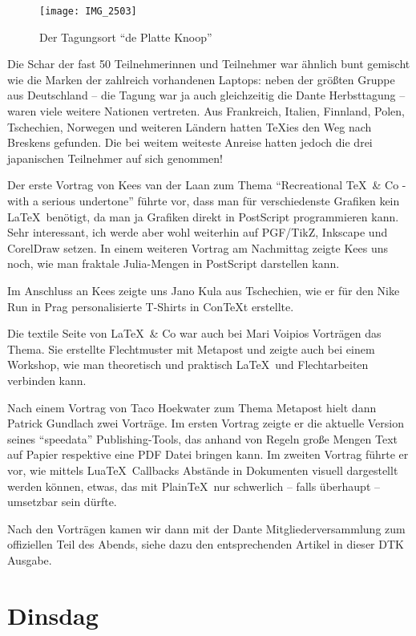 \documentclass[12pt,ngerman]{dtk}
\begin{document}
\begin{figure}
\centering
\texttt{[image: IMG\_2503]}
\caption{Der Tagungsort \enquote{de Platte Knoop}}
\end{figure}

Die Schar der fast 50 Teilnehmerinnen und Teilnehmer war ähnlich bunt gemischt wie die Marken der
 zahlreich vorhandenen Laptops: neben der größten Gruppe aus Deutschland -- die Tagung war ja auch
 gleichzeitig die Dante Herbsttagung -- waren viele weitere Nationen vertreten. Aus Frankreich, Italien,
 Finnland, Polen, Tschechien, Norwegen und weiteren Ländern hatten \TeX ies den Weg nach Breskens
 gefunden. Die bei weitem weiteste Anreise hatten jedoch die drei japanischen Teilnehmer auf sich
 genommen!

Der erste Vortrag von Kees van der Laan zum Thema \enquote{Recreational \TeX\ \& Co - with a serious
 undertone} führte vor, dass man für verschiedenste Grafiken kein \LaTeX\ benötigt, da man ja Grafiken
 direkt in PostScript programmieren kann. Sehr interessant, ich werde aber wohl weiterhin auf PGF/TikZ,
 Inkscape und CorelDraw setzen. In einem weiteren Vortrag am Nachmittag zeigte Kees uns noch, wie
 man fraktale Julia-Mengen in PostScript darstellen kann.

Im Anschluss an Kees zeigte uns Jano Kula aus Tschechien, wie er für den Nike Run in Prag
 personalisierte T-Shirts in Con\TeX t erstellte.

Die textile Seite von \LaTeX\ \& Co war auch bei Mari Voipios Vorträgen das Thema. Sie erstellte
 Flechtmuster mit Metapost  und zeigte auch bei einem Workshop, wie man theoretisch und praktisch
 \LaTeX\ und Flechtarbeiten verbinden kann.

Nach einem Vortrag von Taco Hoekwater zum Thema Metapost hielt dann Patrick Gundlach zwei
 Vorträge. Im ersten Vortrag zeigte er die aktuelle Version seines \enquote{speedata} Publishing-Tools,
 das anhand von Regeln große Mengen Text auf Papier respektive eine PDF Datei bringen kann. 
Im zweiten Vortrag führte er vor, wie mittels Lua\TeX\ Callbacks Abstände in Dokumenten visuell
 dargestellt werden können, etwas, das mit Plain\TeX\ nur schwerlich -- falls überhaupt -- umsetzbar sein
 dürfte.

Nach den Vorträgen kamen wir dann mit der Dante Mitgliederversammlung zum offiziellen Teil des
 Abends, siehe dazu den entsprechenden Artikel in dieser DTK Ausgabe.

\section{Dinsdag}
\end{document}
